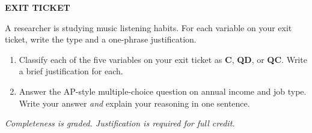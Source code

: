 \documentclass[aspectratio=169, 11pt]{beamer}
\begin{document}
{
\begin{frame}[t, plain]
  \vspace{0.45cm}\par
  \hspace{0.55cm}%
  \begin{minipage}{0.9\textwidth}
    {\color{goldacc}\bfseries\footnotesize\MakeUppercase{Exit Ticket}}
    \vspace{0.5cm}\par
    \small

    {\color{skymid} A researcher is studying music listening habits.
    For each variable on your exit ticket, write the type and a
    one-phrase justification.}

    \vspace{0.5cm}
    \begin{enumerate}
      \setlength{\itemsep}{0.5em}\setlength{\topsep}{0em}
      \item {\color{white}Classify each of the five variables on your exit ticket
            as \textbf{C}, \textbf{QD}, or \textbf{QC}.
            Write a brief justification for each.}
      \item {\color{white}Answer the AP-style multiple-choice question on
            annual income and job type.
            Write your answer \textit{and} explain your reasoning in one sentence.}
    \end{enumerate}

    \vspace{0.6cm}
    {\color{skymid}\small\itshape
      Completeness is graded. Justification is required for full credit.}
  \end{minipage}
\end{frame}
}
\end{document}
